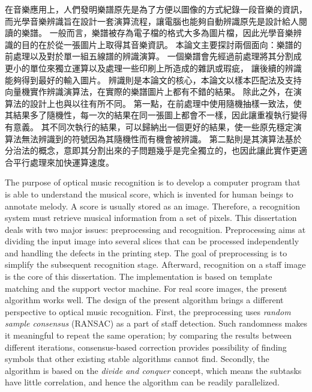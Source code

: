 \begin{abstractzh}
在音樂應用上，人們發明樂譜原先是為了方便以圖像的方式紀錄一段音樂的資訊，
而光學音樂辨識旨在設計一套演算流程，讓電腦也能夠自動辨識原先是設計給人閱讀的樂譜。
一般而言，樂譜被存為電子檔的格式大多為圖片檔，因此光學音樂辨識的目的在於從一張圖片上取得其音樂資訊。
本論文主要探討兩個面向：樂譜的前處理以及對於單一組五線譜的辨識演算。
一個樂譜會先經過前處理將其分割成更小的單位來獨立運算以及處理一些印刷上所造成的雜訊或瑕疵，
讓後續的辨識能夠得到最好的輸入圖片。
辨識則是本論文的核心，本論文以樣本匹配法及支持向量機實作辨識演算法，在實際的樂譜圖片上都有不錯的結果。
除此之外，在演算法的設計上也與以往有所不同。
第一點，在前處理中使用隨機抽樣一致法，使其結果多了隨機性，每一次的結果在同一張圖上都會不一樣，因此讓重複執行變得有意義。
其不同次執行的結果，可以歸納出一個更好的結果，使一些原先穩定演算法無法辨識到的符號因為其隨機性而有機會被辨識。
第二點則是其演算法基於分治法的概念，意即其分割出來的子問題幾乎是完全獨立的，也因此讓此實作更適合平行處理來加快運算速度。
\end{abstractzh}

\begin{abstracten}
The purpose of optical music recognition is to develop a computer program that is able to understand the musical score, which is invented for human beings to annotate melody. A score is usually stored as an image. Therefore, a recognition system must retrieve musical information from a set of pixels.
This dissertation deals with two major issues: preprocessing and recognition. Preprocessing aims at dividing the input image into several slices that can be processed independently and handling the defects in the printing step. The goal of preprocessing is to simplify the subsequent recognition stage. Afterward, recognition on a staff image is the core of this dissertation. The implementation is based on template matching and the support vector machine. For real score images, the present algorithm works well.
The design of the present algorithm brings a different perspective to optical music recognition. First, the preprocessing uses \emph{random sample consensus} (RANSAC) as a part of staff detection. Such randomness makes it meaningful to repeat the same operation; by comparing the results between different iterations, consensus-based correction provides possibility of finding symbols that other existing stable algorithms cannot find. Secondly, the algorithm is based on the \emph{divide and conquer} concept, which means the subtasks have little correlation, and hence the algorithm can be readily parallelized.
\end{abstracten}


\begin{comment}
\category{I2.10}{Computing Methodologies}{Artificial Intelligence --
Vision and Scene Understanding} \category{H5.3}{Information
Systems}{Information Interfaces and Presentation (HCI) -- Web-based
Interaction.}

\terms{Design, Human factors, Performance.}

\keywords{Region of interest, Visual attention model, Web-based
games, Benchmarks.}
\end{comment}
